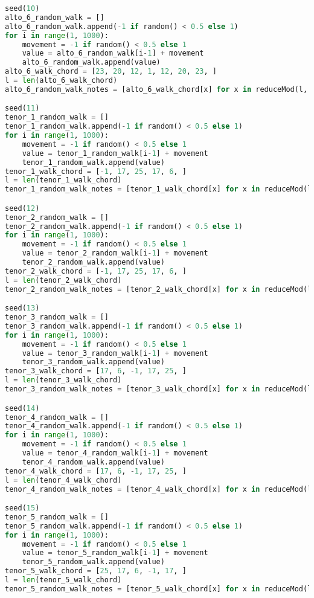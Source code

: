 \begin{lstlisting}[language=Python, caption=Invocation Source Code]
seed(10)
alto_6_random_walk = []
alto_6_random_walk.append(-1 if random() < 0.5 else 1)
for i in range(1, 1000):
    movement = -1 if random() < 0.5 else 1
    value = alto_6_random_walk[i-1] + movement
    alto_6_random_walk.append(value)
alto_6_walk_chord = [23, 20, 12, 1, 12, 20, 23, ]
l = len(alto_6_walk_chord)
alto_6_random_walk_notes = [alto_6_walk_chord[x] for x in reduceMod(l, alto_6_random_walk)]

seed(11)
tenor_1_random_walk = []
tenor_1_random_walk.append(-1 if random() < 0.5 else 1)
for i in range(1, 1000):
    movement = -1 if random() < 0.5 else 1
    value = tenor_1_random_walk[i-1] + movement
    tenor_1_random_walk.append(value)
tenor_1_walk_chord = [-1, 17, 25, 17, 6, ]
l = len(tenor_1_walk_chord)
tenor_1_random_walk_notes = [tenor_1_walk_chord[x] for x in reduceMod(l, tenor_1_random_walk)]

seed(12)
tenor_2_random_walk = []
tenor_2_random_walk.append(-1 if random() < 0.5 else 1)
for i in range(1, 1000):
    movement = -1 if random() < 0.5 else 1
    value = tenor_2_random_walk[i-1] + movement
    tenor_2_random_walk.append(value)
tenor_2_walk_chord = [-1, 17, 25, 17, 6, ]
l = len(tenor_2_walk_chord)
tenor_2_random_walk_notes = [tenor_2_walk_chord[x] for x in reduceMod(l, tenor_2_random_walk)]

seed(13)
tenor_3_random_walk = []
tenor_3_random_walk.append(-1 if random() < 0.5 else 1)
for i in range(1, 1000):
    movement = -1 if random() < 0.5 else 1
    value = tenor_3_random_walk[i-1] + movement
    tenor_3_random_walk.append(value)
tenor_3_walk_chord = [17, 6, -1, 17, 25, ]
l = len(tenor_3_walk_chord)
tenor_3_random_walk_notes = [tenor_3_walk_chord[x] for x in reduceMod(l, tenor_3_random_walk)]

seed(14)
tenor_4_random_walk = []
tenor_4_random_walk.append(-1 if random() < 0.5 else 1)
for i in range(1, 1000):
    movement = -1 if random() < 0.5 else 1
    value = tenor_4_random_walk[i-1] + movement
    tenor_4_random_walk.append(value)
tenor_4_walk_chord = [17, 6, -1, 17, 25, ]
l = len(tenor_4_walk_chord)
tenor_4_random_walk_notes = [tenor_4_walk_chord[x] for x in reduceMod(l, tenor_4_random_walk)]

seed(15)
tenor_5_random_walk = []
tenor_5_random_walk.append(-1 if random() < 0.5 else 1)
for i in range(1, 1000):
    movement = -1 if random() < 0.5 else 1
    value = tenor_5_random_walk[i-1] + movement
    tenor_5_random_walk.append(value)
tenor_5_walk_chord = [25, 17, 6, -1, 17, ]
l = len(tenor_5_walk_chord)
tenor_5_random_walk_notes = [tenor_5_walk_chord[x] for x in reduceMod(l, tenor_5_random_walk)]


\end{lstlisting}
